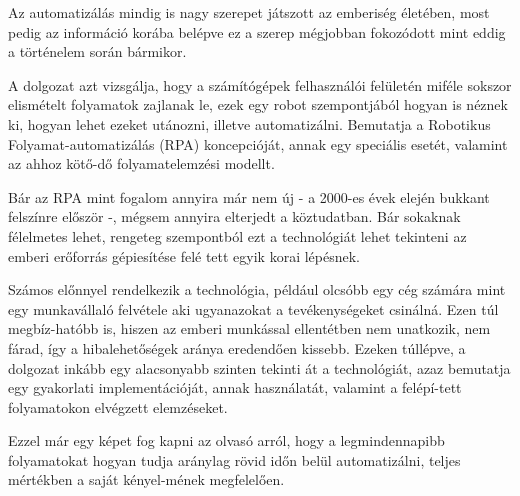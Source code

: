 
Az automatizálás mindig is nagy szerepet játszott az emberiség életében, most pedig az információ korába belépve ez a szerep mégjobban fokozódott mint eddig a történelem során bármikor.

A dolgozat azt vizsgálja, hogy a számítógépek felhasználói felületén miféle sokszor elismételt folyamatok zajlanak le, ezek egy robot szempontjából hogyan is néznek ki, hogyan lehet ezeket utánozni, illetve automatizálni. Bemutatja a Robotikus Folyamat\hyp{}automatizálás (RPA) koncepcióját, annak egy speciális esetét, valamint az ahhoz kötő\hyp{}dő folyamatelemzési modellt.

Bár az RPA mint fogalom annyira már nem új - a 2000-es évek elején bukkant felszínre először -, mégsem annyira elterjedt a köztudatban. Bár sokaknak félelmetes lehet, rengeteg szempontból ezt a technológiát lehet tekinteni az emberi erőforrás gépiesítése felé tett egyik korai lépésnek.

Számos előnnyel rendelkezik a technológia, például olcsóbb egy cég számára mint egy munkavállaló felvétele aki ugyanazokat a tevékenységeket csinálná. Ezen túl megbíz\hyp{}hatóbb is, hiszen az emberi munkással ellentétben nem unatkozik, nem fárad, így a hibalehetőségek aránya eredendően kissebb.
\newline\newline
Ezeken túllépve, a dolgozat inkább egy alacsonyabb szinten tekinti át a technológiát, azaz bemutatja egy gyakorlati implementációját, annak használatát, valamint a felépí\hyp{}tett folyamatokon elvégzett elemzéseket.

Ezzel már egy képet fog kapni az olvasó arról, hogy a legmindennapibb folyamatokat hogyan tudja aránylag rövid időn belül automatizálni, teljes mértékben a saját kényel\hyp{}mének megfelelően.